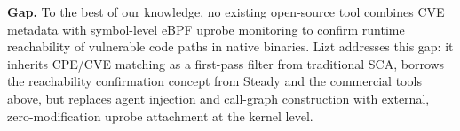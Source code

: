 \documentclass[conference]{IEEEtran}
\newcommand{\cmark}{\ding{51}}
\newcommand{\xmark}{\ding{55}}
\begin{document}
\textbf{Gap.}
To the best of our knowledge, no existing open-source tool combines CVE metadata with symbol-level eBPF uprobe monitoring to confirm runtime reachability of vulnerable code paths in native binaries. Lizt addresses this gap: it inherits CPE/CVE matching as a first-pass filter from traditional SCA, borrows the reachability confirmation concept from Steady and the commercial tools above, but replaces agent injection and call-graph construction with external, zero-modification uprobe attachment at the kernel level.


\end{document}

